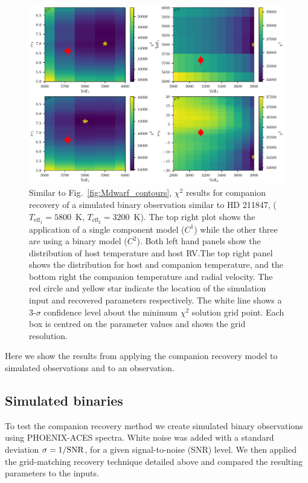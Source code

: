 \documentclass[fleqn,usenatbib]{mnras}
\begin{document}
\begin{figure}
    \centering
    \includegraphics[width=0.8\hsize]{images/fig4.pdf}
    \caption{Similar to Fig.~\ref{fig:Mdwarf_contours}, \(\chi^2\) results for companion recovery of a simulated binary observation similar to {HD 211847}, (\(T_{\textrm{eff}_1} = 5800\)~K, \(T_{\textrm{eff}_2}=3200\)~K). The top right plot shows the application of a single component model (\(C^1\)) while the other three are using a binary model (\(C^2\)). Both left hand panels show the distribution of host temperature and host RV.\@ The top right panel shows the distribution for host and companion temperature, and the bottom right the companion temperature and radial velocity.
        The red circle and yellow star indicate the location of the simulation input and recovered parameters respectively.
        The white line shows a 3-\(\sigma\) confidence level about the minimum \(\chi^2\) solution grid point. Each box is centred on the parameter values and shows the grid resolution.}
    \label{fig:HD211847_simulated_contours}
\end{figure}
Here we show the results from applying the companion recovery model to simulated observations and to an observation.

\subsection{Simulated binaries}
\label{subsec:simulated_binaries}
To test the companion recovery method we create simulated binary observations using PHOENIX-ACES spectra. White noise was added with a standard deviation \(\rm \sigma = 1/SNR\), for a given signal-to-noise (SNR) level. We then applied the grid-matching recovery technique detailed above and compared the resulting parameters to the inputs.
\end{document}
